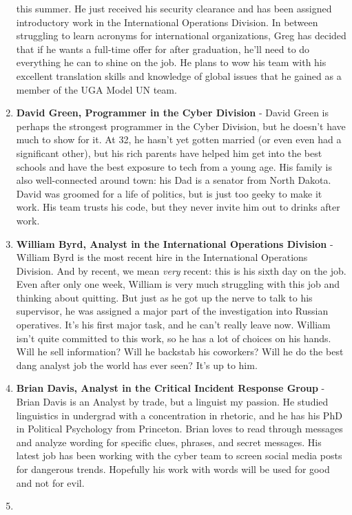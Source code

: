 \documentclass[10pt, letterpaper]{article}
\begin{document}
\begin{enumerate}
  this summer. He just received his security clearance and has been
  assigned introductory work in the International Operations Division.
  In between struggling to learn acronyms for international
  organizations, Greg has decided that if he wants a full-time offer for
  after graduation, he'll need to do everything he can to shine on the
  job. He plans to wow his team with his excellent translation skills
  and knowledge of global issues that he gained as a member of the UGA
  Model UN team.
\item
  \textbf{David Green, Programmer in the Cyber Division} - David Green
  is perhaps the strongest programmer in the Cyber Division, but he
  doesn't have much to show for it. At 32, he hasn't yet gotten married
  (or even even had a significant other), but his rich parents have
  helped him get into the best schools and have the best exposure to
  tech from a young age. His family is also well-connected around town:
  his Dad is a senator from North Dakota. David was groomed for a life
  of politics, but is just too geeky to make it work. His team trusts
  his code, but they never invite him out to drinks after work.
\item
  \textbf{William Byrd, Analyst in the International Operations
  Division} - William Byrd is the most recent hire in the International
  Operations Division. And by recent, we mean \emph{very} recent: this
  is his sixth day on the job. Even after only one week, William is very
  much struggling with this job and thinking about quitting. But just as
  he got up the nerve to talk to his supervisor, he was assigned a major
  part of the investigation into Russian operatives. It's his first
  major task, and he can't really leave now. William isn't quite
  committed to this work, so he has a lot of choices on his hands. Will
  he sell information? Will he backstab his coworkers? Will he do the
  best dang analyst job the world has ever seen? It's up to him.
\item
  \textbf{Brian Davis, Analyst in the Critical Incident Response Group}
  - Brian Davis is an Analyst by trade, but a linguist my passion. He
  studied linguistics in undergrad with a concentration in rhetoric, and
  he has his PhD in Political Psychology from Princeton. Brian loves to
  read through messages and analyze wording for specific clues, phrases,
  and secret messages. His latest job has been working with the cyber
  team to screen social media posts for dangerous trends. Hopefully his
  work with words will be used for good and not for evil.
\item

\end{enumerate}
\end{document}
